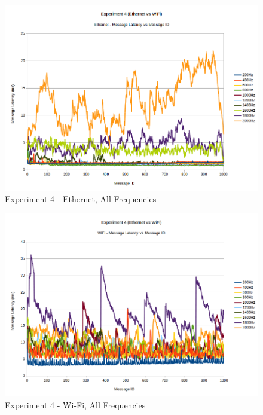 \documentclass[../dissertation.tex]{subfiles}
\begin{document}
\begin{figure}[H]
\centering
\includegraphics[width=\textwidth]{images/experiment4/ethernet_mean_times_pretty.png}
\caption{Experiment 4 - Ethernet, All Frequencies}
\label{exp4-ethernet-all-freq}
\end{figure}

\begin{figure}[H]
\centering
\includegraphics[width=\textwidth]{images/experiment4/wifi_mean_times_pretty.png}
\caption{Experiment 4 - Wi-Fi, All Frequencies}
\label{exp4-wifi-all-freq}
\end{figure}
\end{document}
